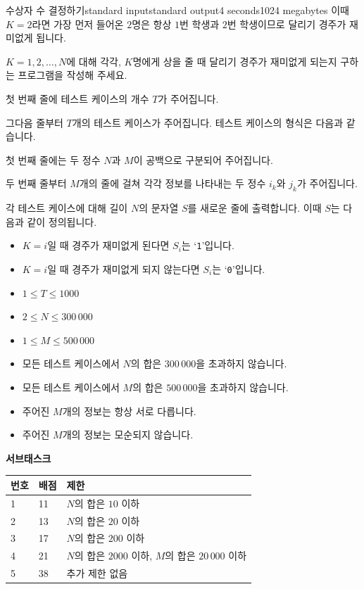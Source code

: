 \begin{problem}{수상자 수 결정하기}{standard input}{standard output}{4 seconds}{1024 megabytes}
이때 $K=2$라면 가장 먼저 들어온 $2$명은 항상 $1$번 학생과 $2$번 학생이므로 달리기 경주가 재미없게 됩니다.

$K=1,2,\ldots,N$에 대해 각각, $K$명에게 상을 줄 때 달리기 경주가 재미없게 되는지 구하는 프로그램을 작성해 주세요.

\InputFile
첫 번째 줄에 테스트 케이스의 개수 $T$가 주어집니다.

그다음 줄부터 $T$개의 테스트 케이스가 주어집니다. 테스트 케이스의 형식은 다음과 같습니다.

첫 번째 줄에는 두 정수 $N$과 $M$이 공백으로 구분되어 주어집니다.

두 번째 줄부터 $M$개의 줄에 걸쳐 각각 정보를 나타내는 두 정수 $i_k$와 $j_k$가 주어집니다.

\OutputFile
각 테스트 케이스에 대해 길이 $N$의 문자열 $S$를 새로운 줄에 출력합니다. 이때 $S$는 다음과 같이 정의됩니다.

\begin{itemize}
\item $K=i$일 때 경주가 재미없게 된다면 $S_i$는 `\texttt{1}'입니다.
\item $K=i$일 때 경주가 재미없게 되지 않는다면 $S_i$는 `\texttt{0}'입니다.
\end{itemize}

\Scoring
\begin{itemize}
\item $1 \le T \le 1000$
\item $2 \le N \le 300\,000$
\item $1 \le M \le 500\,000$
\item 모든 테스트 케이스에서 $N$의 합은 $300\,000$을 초과하지 않습니다.
\item 모든 테스트 케이스에서 $M$의 합은 $500\,000$을 초과하지 않습니다.
\item 주어진 $M$개의 정보는 항상 서로 다릅니다.
\item 주어진 $M$개의 정보는 모순되지 않습니다.
\end{itemize}

\textbf{서브태스크}

\begin{tabular}{|l|l|l|} \hline
  \textbf{번호} & \textbf{배점} & \textbf{제한} \\ \hline
  1 & 11 & $N$의 합은 $10$ 이하 \\ \hline
  2 & 13 & $N$의 합은 $20$ 이하 \\ \hline
  3 & 17 & $N$의 합은 $200$ 이하 \\ \hline
  4 & 21 & $N$의 합은 $2000$ 이하, $M$의 합은 $20\,000$ 이하 \\ \hline
  5 & 38 & 추가 제한 없음 \\ \hline
\end{tabular}


\end{problem}
